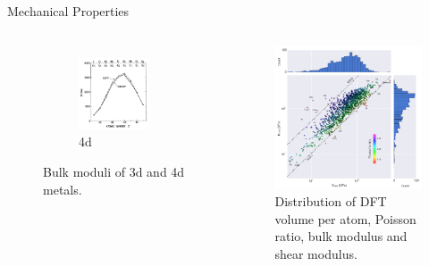 \documentclass[aspectratio=169]{beamer}
\begin{document}
\begin{frame}{Mechanical Properties}
\begin{columns}
\begin{figure}
\begin{subfigure}{0.45\textwidth}
        \includegraphics[width=\linewidth]{lectures/figures/8_4D_TM_Bulk_Moduli.png}
    \caption{4d}
    \end{subfigure}
    \caption{Bulk moduli of 3d and 4d metals.\cite{moruzziTrendsBulkModuli1993}}
\end{figure} 


\begin{figure}
    \centering
    \includegraphics[width=0.7\linewidth]{lectures/figures/8_MP_Elastic_Moduli.png}
    \caption{Distribution of DFT volume per atom, Poisson ratio, bulk modulus and shear modulus.\cite{dejongChartingCompleteElastic2015}}
\end{figure} 

\end{columns} 
\end{frame}
\end{document}
